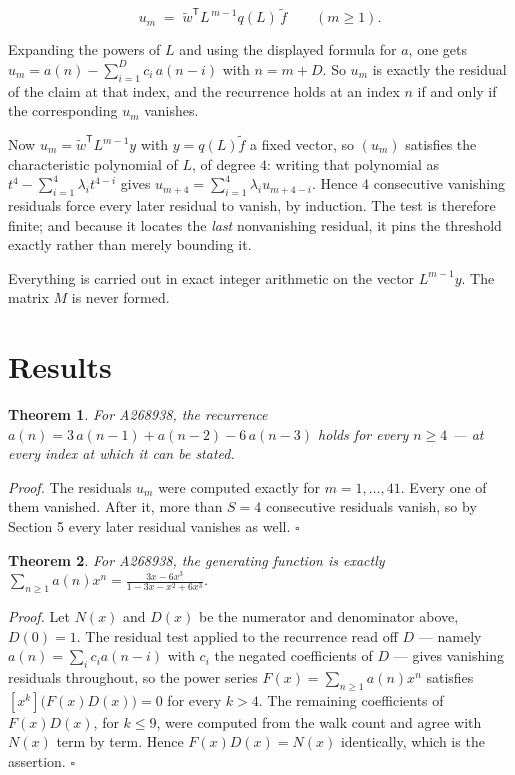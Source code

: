 \documentclass[11pt]{article}
\newtheorem{theorem}{Theorem}
\theoremstyle{definition}
\begin{document}
\[u_m \;=\; \tilde w^{\mathsf T} L^{\,m-1} q(L)\,\tilde f \qquad (m \ge 1).\]

Expanding the powers of $L$ and using the displayed formula for $a$, one gets $u_m = a(n) - \sum_{i=1}^{D} c_i\,a(n-i)$ with $n = m + D$. So $u_m$ is exactly the residual of the claim at that index, and the recurrence holds at an index $n$ if and only if the corresponding $u_m$ vanishes.

Now $u_m = \tilde w^{\mathsf T} L^{m-1} y$ with $y = q(L)\tilde f$ a fixed vector, so $(u_m)$ satisfies the characteristic polynomial of $L$, of degree $4$: writing that polynomial as $t^{4} - \sum_{i=1}^{4} \lambda_i t^{4-i}$ gives $u_{m+4} = \sum_{i=1}^{4} \lambda_i u_{m+4-i}$. Hence $4$ consecutive vanishing residuals force every later residual to vanish, by induction. The test is therefore finite; and because it locates the {\itshape last} nonvanishing residual, it pins the threshold exactly rather than merely bounding it.

Everything is carried out in exact integer arithmetic on the vector $L^{m-1}y$. The matrix $M$ is never formed.

\section{Results}

\begin{theorem} For A268938, the recurrence $a(n) = 3\,a(n-1) + a(n-2) - 6\,a(n-3)$ holds for every $n \ge 4$ --- at every index at which it can be stated.\end{theorem}

{\itshape Proof.} The residuals $u_m$ were computed exactly for $m = 1,\dots,41$. Every one of them vanished. After it, more than $S = 4$ consecutive residuals vanish, so by Section 5 every later residual vanishes as well. $\square$

\begin{theorem} For A268938, the generating function is exactly $\sum_{n\ge 1} a(n)x^n = \frac{3x - 6x^{3}}{1 - 3x - x^{2} + 6x^{3}}$.\end{theorem}

{\itshape Proof.} Let $N(x)$ and $D(x)$ be the numerator and denominator above, $D(0)=1$. The residual test applied to the recurrence read off $D$ --- namely $a(n) = \sum_i c_i a(n-i)$ with $c_i$ the negated coefficients of $D$ --- gives vanishing residuals throughout, so the power series $F(x)=\sum_{n\ge 1}a(n)x^n$ satisfies $[x^k]\bigl(F(x)D(x)\bigr) = 0$ for every $k > 4$. The remaining coefficients of $F(x)D(x)$, for $k \le 9$, were computed from the walk count and agree with $N(x)$ term by term. Hence $F(x)D(x) = N(x)$ identically, which is the assertion. $\square$
\end{document}
